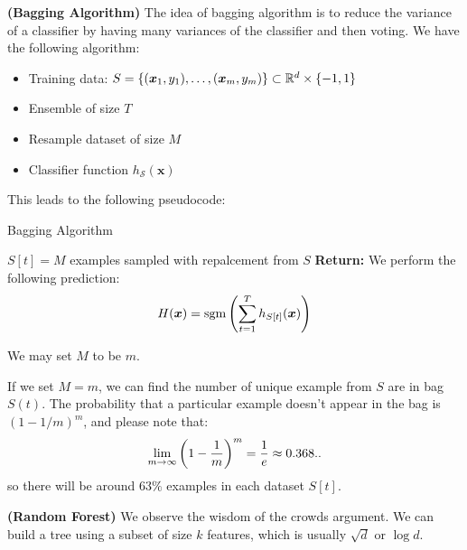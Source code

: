 \begin{definition}{\textbf{(Bagging Algorithm)}}
    The idea of bagging algorithm is to reduce the variance of a classifier by having many variances of the classifier and then voting. We have the following algorithm: 
    \begin{itemize}
        \item Training data: $S = \left\{ (\boldsymbol x_1,y_1),\dots,(\boldsymbol x_m, y_m) \right\} \subset \mathbb{R}^d \times \left\{ -1, 1 \right\}$
        \item Ensemble of size $T$
        \item Resample dataset of size $M$
        \item Classifier function $h_\mathcal{S}(\boldsymbol x)$
    \end{itemize} 
    This leads to the following pseudocode:
    \begin{algorithm}[H]
        \caption{Bagging Algorithm}
    	\begin{algorithmic}[1]
    		    \State $S[t] = M$ examples sampled with repalcement from $S$ 
    		\EndFor
            \State \textbf{Return:} We perform the following prediction:
            \begin{equation*}
                H(\boldsymbol x) = \operatorname{sgm}\left( \sum^T_{t=1}h_{S[t]}(\boldsymbol x) \right)
            \end{equation*}
        \end{algorithmic} 
    \end{algorithm}
    We may set $M$ to be $m$. 
\end{definition}

\begin{remark}
    If we set $M=m$, we can find the number of unique example from $S$ are in bag $S(t)$. The probability that a particular example doesn't appear in the bag is $(1-1/m)^m$, and please note that:
    \begin{equation*}
        \lim_{m\rightarrow\infty}\left( 1-\frac{1}{m} \right)^m = \frac{1}{e}\approx 0.368..
    \end{equation*}
    so there will be around $63\%$ examples in each dataset $S[t]$.
\end{remark}

\begin{definition}{\textbf{(Random Forest)}}
    We observe the wisdom  of the crowds argument. We can build a tree using a subset of size $k$ features, which is usually $\sqrt{d}$ or $\log d$.
\end{definition}

